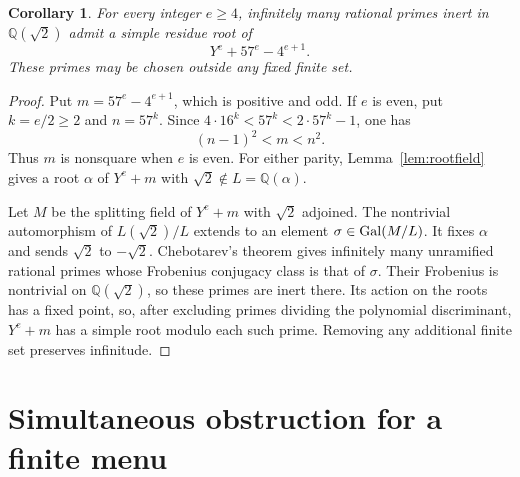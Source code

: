 \documentclass[11pt,a4paper]{article}
\newtheorem{corollary}[theorem]{Corollary}
\newcommand{\Q}{\mathbb Q}\newcommand{\Z}{\mathbb Z}
\begin{document}
\begin{corollary}\label{cor:primes}
For every integer $e\ge4$, infinitely many rational primes inert in
$\Q(\sqrt2)$ admit a simple residue root of
\[
                         Y^e+57^e-4^{e+1}.
\]
These primes may be chosen outside any fixed finite set.
\end{corollary}
\begin{proof}
Put $m=57^e-4^{e+1}$, which is positive and odd. If $e$ is even,
put $k=e/2\ge2$ and $n=57^k$. Since
$4\cdot16^k<57^k<2\cdot57^k-1$, one has
\[
                              (n-1)^2<m<n^2.
\]
Thus $m$ is nonsquare when $e$ is even. For either parity,
Lemma~\ref{lem:rootfield} gives a root $\alpha$ of $Y^e+m$ with
$\sqrt2\notin L=\Q(\alpha)$.

Let $M$ be the splitting field of $Y^e+m$ with $\sqrt2$ adjoined.
The nontrivial automorphism of $L(\sqrt2)/L$ extends to an element
$\sigma\in\operatorname{Gal}(M/L)$. It fixes $\alpha$ and sends $\sqrt2$ to
$-\sqrt2$. Chebotarev's theorem\cite[Theorem 8.31]{Milne} gives
infinitely many unramified rational primes whose Frobenius conjugacy
class is that of $\sigma$. Their Frobenius is nontrivial on
$\Q(\sqrt2)$, so these primes are inert there. Its action on the
roots has a fixed point, so, after excluding primes dividing the
polynomial discriminant, $Y^e+m$ has a simple root modulo each
such prime. Removing any additional finite set preserves infinitude.
\end{proof}

\section{Simultaneous obstruction for a finite menu}
\end{document}
